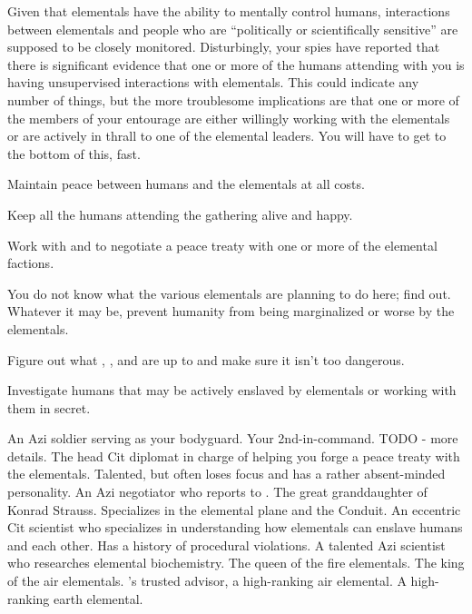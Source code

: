 \documentclass[char]{elementals}
\begin{document}
Given that elementals have the ability to mentally control humans, interactions between elementals and people who are ``politically or scientifically sensitive'' are supposed to be closely monitored. Disturbingly, your spies have reported that there is significant evidence that one or more of the humans attending with you is having unsupervised interactions with elementals. This could indicate any number of things, but the more troublesome implications are that one or more of the members of your entourage are either willingly working with the elementals or are actively in thrall to one of the elemental leaders. You will have to get to the bottom of this, fast.



\begin{itemz}[Goals]
  \item Maintain peace between humans and the elementals at all costs.
  \item Keep all the humans attending the gathering alive and happy.
  \item Work with \cAvatar{} and \cDiplomat{} to negotiate a peace treaty with one or more of the elemental factions.
  \item You do not know what the various elementals are planning to do here; find out. Whatever it may be, prevent humanity from being marginalized or worse by the elementals.
  \item Figure out what \cGD{}, \cMS{}, and \cScientist{} are up to and make sure it isn't too dangerous.
  \item Investigate humans that may be actively enslaved by elementals or working with them in secret.
\end{itemz}

\begin{contacts}
  \contact{\cRomeo{}} An Azi soldier serving as your bodyguard.
  \contact{\cDema{}} Your 2nd-in-command. TODO - more details.
	\contact{\cAvatar{}} The head Cit diplomat in charge of helping you forge a peace treaty with the elementals. Talented, but often loses focus and has a rather absent-minded personality.
	\contact{\cDiplomat{}} An Azi negotiator who reports to \cAvatar{}.
	\contact{\cGD{}} The great granddaughter of Konrad Strauss. Specializes in the elemental plane and the Conduit.
	\contact{\cMS{}} An eccentric Cit scientist who specializes in understanding how elementals can enslave humans and each other. Has a history of procedural violations.
	\contact{\cScientist{}} A talented Azi scientist who researches elemental biochemistry.
	\contact{\cQueen{}} The queen of the fire elementals.
	\contact{\cKing{}} The king of the air elementals.
	\contact{\cNaturalist{}} \cKing{}'s trusted advisor, a high-ranking air elemental.
	\contact{\cLoyal{}} A high-ranking earth elemental.
\end{contacts}
\end{document}
